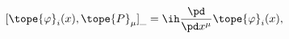 \begin{equation}	\label{6.8}
[\tope{\varphi}_i(x), \tope{P}_\mu ]_{\_}
=
\ih\frac{\pd}{\pd x^\mu} \tope{\varphi}_i(x) ,
	\end{equation}

